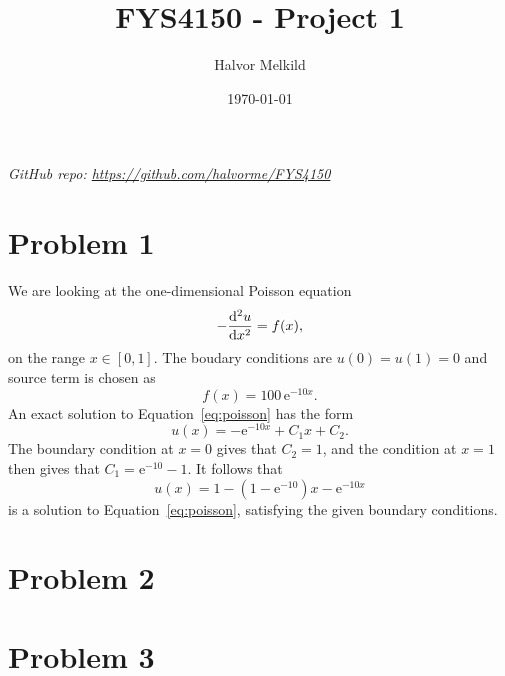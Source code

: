 \documentclass[english,notitlepage,aps,pra,10pt]{revtex4-1}  %
\newcommand{\e}{\mathrm{e}}
\begin{document}
\title{FYS4150 - Project 1}      %
\author{Halvor Melkild}          %
\date{\today}                             %
\noaffiliation                            %


\maketitle

\textit{GitHub repo: \href{https://github.com/halvorme/FYS4150/}{https://github.com/halvorme/FYS4150}}

\section*{Problem 1}

We are looking at the one-dimensional Poisson equation 
\begin{equation}
    -\dv[2]{u}{x} = f(x),
    \label{eq:poisson}
\end{equation}
on the range $x \in [0,1]$. The boudary conditions are $u(0) = u(1) = 0$ and source term is chosen as 
\begin{equation}
    f(x) = 100\, \e^{-10x}.
\end{equation}
An exact solution to Equation~\ref{eq:poisson} has the form 
\begin{equation}
    u(x) = -\e^{-10x} + C_1 x + C_2.
\end{equation}
The boundary condition at $x=0$ gives that $C_2 = 1$, and the condition at $x=1$ then gives that $C_1 = \e^{-10} - 1$. It follows that 
\begin{equation}
    u(x) = 1 - (1-\e^{-10})x - \e^{-10x} 
\end{equation}
is a solution to Equation~\ref{eq:poisson}, satisfying the given boundary conditions.


\section*{Problem 2}

\section*{Problem 3}
\end{document}
